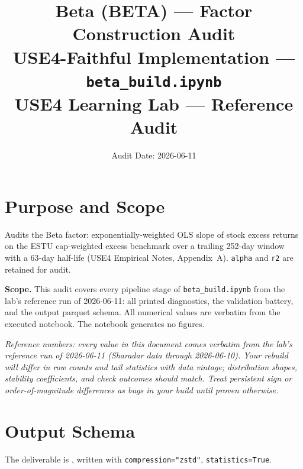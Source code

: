 \documentclass[11pt,a4paper]{article}
\title{\textbf{Beta (BETA) --- Factor Construction Audit}\\[2pt]
\large USE4-Faithful Implementation --- \texttt{beta\_build.ipynb}\\[4pt]
\normalsize USE4 Learning Lab --- Reference Audit}
\author{Audit Date: 2026-06-11}
\date{}
\newcommand{\NOTE}[1]{\textcolor{note}{\textit{#1}}}
\begin{document}
\maketitle
\tableofcontents
\newpage

\section{Purpose and Scope}

Audits the Beta factor: exponentially-weighted OLS slope of stock
excess returns on the ESTU cap-weighted excess benchmark over a trailing 252-day
window with a 63-day half-life (USE4 Empirical Notes, Appendix~A). \texttt{alpha}
and \texttt{r2} are retained for audit.

\smallskip
\textbf{Scope.} This audit covers every pipeline stage of
\texttt{beta\_build.ipynb} from the lab's reference run of 2026-06-11: all printed diagnostics, the
validation battery, and the output parquet schema. All numerical values are
verbatim from the executed notebook. The notebook generates no figures.

\NOTE{Reference numbers: every value in this document comes verbatim from the lab's reference run of 2026-06-11 (Sharadar data through 2026-06-10). Your rebuild will differ in row counts and tail statistics with data vintage; distribution shapes, stability coefficients, and check outcomes should match. Treat persistent sign or order-of-magnitude differences as bugs in your build until proven otherwise.}


\section{Output Schema}

The deliverable is , written with
\texttt{compression="zstd"}, \newline\texttt{statistics=True}.
\end{document}
